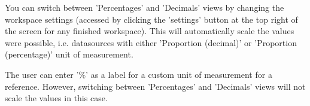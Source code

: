 \documentclass[00_mcda_tutorial.tex]{subfiles}
\begin{document}
\noindent You can switch between 'Percentages' and 'Decimals' views by changing the workspace settings (accessed by clicking the 'settings' button at the top right of the screen for any finished workspace). This will automatically scale the values were possible, i.e. datasources with either 'Proportion (decimal)' or 'Proportion (percentage)' unit of measurement.
\newline

\noindent The user can enter '\%' as a label for a custom unit of measurement for a reference. However, switching between 'Percentages' and 'Decimals' views will not scale the values in this case.
\end{document}
